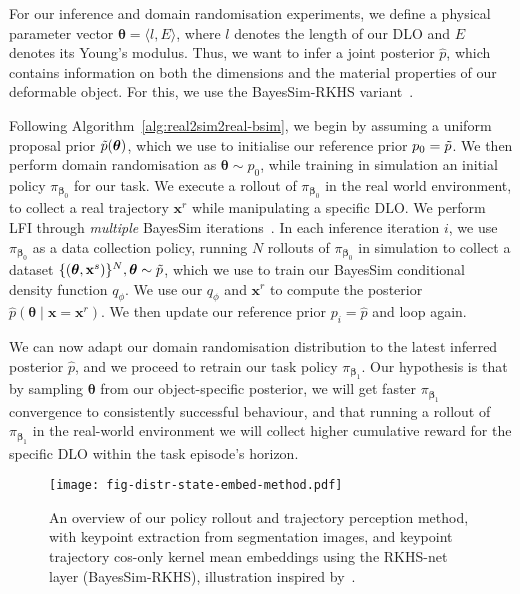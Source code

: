 For our inference and domain randomisation experiments, we define a physical parameter vector $\boldsymbol{\theta} = \langle l, E \rangle$, where $l$ denotes the length of our DLO and $E$ denotes its Young's modulus. Thus, we want to infer a joint posterior $\hat{p}$, which contains information on both the dimensions and the material properties of our deformable object. For this, we use the BayesSim-RKHS variant~\cite{antonova2022bayesian}.

Following Algorithm~\ref{alg:real2sim2real-bsim}, we begin by assuming a uniform proposal prior $\Tilde{p}(\boldsymbol{\theta})$, which we use to initialise our reference prior $p_0 = \Tilde{p}$. We then perform domain randomisation as $\boldsymbol{\theta} \sim p_0$, while training in simulation an initial policy $\pi_{\boldsymbol{\beta}_0}$ for our task. We execute a rollout of $\pi_{\boldsymbol{\beta}_0}$ in the real world environment, to collect a real trajectory $\mathbf{x}^r$ while manipulating a specific DLO. We perform LFI through \emph{multiple} BayesSim iterations~\cite{possas2020online, antonova2022bayesian}. In each inference iteration $i$, we use $\pi_{\boldsymbol{\beta}_0}$ as a data collection policy, running $N$ rollouts of $\pi_{\boldsymbol{\beta}_0}$ in simulation to collect a dataset $\{(\boldsymbol{\theta}, \mathbf{x}^s)\}^N, \boldsymbol{\theta} \sim \Tilde{p}$, which we use to train our BayesSim conditional density function $q_{\phi}$. We use our $q_{\phi}$ and $\mathbf{x}^r$ to compute the posterior $\hat{p}(\boldsymbol{\theta} \mid \mathbf{x} = \mathbf{x}^r)$. We then update our reference prior $p_i = \hat{p}$ and loop again.

We can now adapt our domain randomisation distribution to the latest inferred posterior $\hat{p}$, and we proceed to retrain our task policy $\pi_{\boldsymbol{\beta}_1}$. Our hypothesis is that by sampling $\boldsymbol{\theta}$ from our object-specific posterior, we will get faster $\pi_{\boldsymbol{\beta}_1}$ convergence to consistently successful behaviour, and that running a rollout of $\pi_{\boldsymbol{\beta}_1}$ in the real-world environment we will collect higher cumulative reward for the specific DLO within the task episode's horizon.

\begin{figure}[t]
    \centering
    \texttt{[image: fig-distr-state-embed-method.pdf]}
    \caption{An overview of our policy rollout and trajectory perception method, with keypoint extraction from segmentation images, and keypoint trajectory cos-only kernel mean embeddings using the RKHS-net layer (BayesSim-RKHS), illustration inspired by~\cite{antonova2022bayesian}.}
    \label{fig:perc-to-rkhs}
\end{figure}

